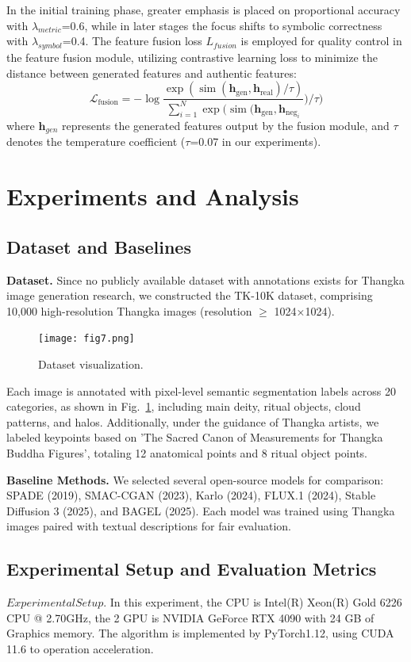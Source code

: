 \documentclass[sn-mathphys]{sn-jnl}%
\theoremstyle{thmstyleone}%
\theoremstyle{thmstyletwo}%
\theoremstyle{thmstylethree}%
\begin{document}
In the initial training phase, greater emphasis is placed on proportional accuracy with $ {\lambda _{metric}} $=0.6, while in later stages the focus shifts to symbolic correctness with $ {\lambda _{symbol}} $=0.4. The feature fusion loss $ L_{fusion} $ is employed for quality control in the feature fusion module, utilizing contrastive learning loss to minimize the distance between generated features and authentic features:
\begin{equation}
	\mathcal{L}_{\mathrm{fusion}}=-\operatorname{log}\frac{\operatorname{exp}(\operatorname{sim}(\mathbf{h}_{\mathrm{gen}},\mathbf{h}_{\mathrm{real}})/\tau)}{\sum_{i=1}^{N}\operatorname{exp}(\operatorname{sim}(\mathbf{h}_{\mathrm{gen}},\mathbf{h}_{\mathrm{neg}_{i}}})/\tau)
	\label{eq21}
\end{equation}
where $ \textbf{h}_{gen} $ represents the generated features output by the fusion module, and $\tau$ denotes the temperature coefficient ($\tau$=0.07 in our experiments). 
\section{Experiments and Analysis}
\subsection{Dataset and Baselines}
\textbf{Dataset.} Since no publicly available dataset with annotations exists for Thangka image generation research, we constructed the TK-10K dataset, comprising 10,000 high-resolution Thangka images (resolution $ \ge $ 1024×1024).
\begin{figure}[htbp]
	\centerline{\texttt{[image: fig7.png]}}
	\caption{Dataset visualization.}
	\label{fig7}
\end{figure}
Each image is annotated with pixel-level semantic segmentation labels across 20 categories, as shown in Fig.~\ref{fig7}, including main deity, ritual objects, cloud patterns, and halos. Additionally, under the guidance of Thangka artists, we labeled keypoints based on 'The Sacred Canon of Measurements for Thangka Buddha Figures', totaling 12 anatomical points and 8 ritual object points.

\textbf{Baseline Methods.} We selected several open-source models for comparison: SPADE\cite{b14} (2019), SMAC-CGAN\cite{b15} (2023), Karlo\cite{b21} (2024), FLUX.1\cite{b22} (2024), Stable Diffusion 3\cite{b24} (2025), and BAGEL\cite{b23} (2025). Each model was trained using Thangka images paired with textual descriptions for fair evaluation.
\subsection{Experimental Setup and Evaluation Metrics}
$ Experimental Setup. $ In this experiment, the CPU is Intel(R) Xeon(R) Gold 6226 CPU @ 2.70GHz, the 2 GPU is NVIDIA GeForce RTX 4090 with 24 GB of Graphics memory. The algorithm is implemented by PyTorch1.12, using CUDA 11.6 to operation acceleration. 
\end{document}
